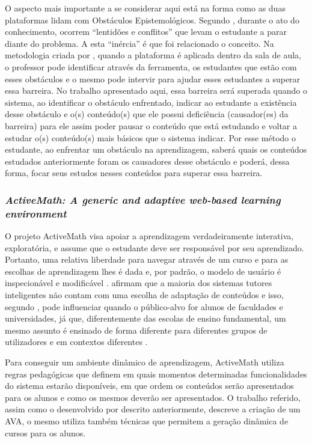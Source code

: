 O aspecto mais importante a se considerar aqui está na forma como as duas plataformas lidam com Obstáculos Epistemológicos. Segundo , durante o ato do conhecimento, 
ocorrem ``lentidões e conflitos'' que levam o estudante a parar diante do problema. A esta ``inércia'' é que foi relacionado o conceito. Na metodologia criada por , quando a 
plataforma é aplicada dentro da sala de aula, o professor pode identificar através da ferramenta, os estudantes que estão com esses obstáculos e o mesmo pode intervir para ajudar esses estudantes a 
superar essa barreira. No trabalho apresentado aqui, essa barreira será superada quando o sistema, ao identificar o obstáculo enfrentado, indicar ao estudante a exist\^encia desse obst\'aculo e o(s) 
conte\'udo(s) que ele possui defici\^encia (causador(es) da barreira) para ele assim poder pausar o conte\'udo que est\'a estudando e voltar a estudar o(s) conte\'udo(s) mais b\'asicos que o sistema 
indicar. Por esse método o  estudante, ao enfrentar um obst\'aculo na aprendizagem, saber\'a quais os conte\'udos estudados anteriormente foram os causadores desse obst\'aculo e poder\'a, dessa 
forma, focar seus estudos nesses conte\'udos para superar essa barreira.

\subsubsection{\textit{ActiveMath: A generic and adaptive web-based learning environment}}

O projeto ActiveMath visa apoiar a aprendizagem verdadeiramente interativa, exploratória, e assume que o estudante deve ser responsável por seu aprendizado. Portanto, uma relativa liberdade para 
navegar através de um curso e para as escolhas de aprendizagem lhes é dada e, por padrão, o modelo de usuário é inspecionável e modificável \cite{melis2001activemath}. 
 afirmam que a maioria dos sistemas tutores inteligentes não contam com uma escolha de adaptação de conteúdos e isso, segundo , pode 
influenciar quando o público-alvo for alunos de faculdades e universidades, já que, diferentemente das escolas de ensino fundamental,  um mesmo assunto é ensinado de forma diferente para diferentes 
grupos de utilizadores e em contextos diferentes \cite{melis2001activemath}.

Para conseguir um ambiente dinâmico de aprendizagem, ActiveMath utiliza regras pedagógicas que definem em quais momentos determinadas funcionalidades do sistema estarão disponíveis, em que ordem os 
conteúdos serão apresentados para os alunos e como os mesmos deverão ser apresentados. O trabalho referido,  assim como o desenvolvido por  descrito anteriormente, descreve a 
criação de um AVA, o mesmo utiliza tamb\'em técnicas que permitem a geração dinâmica de cursos para os alunos.

